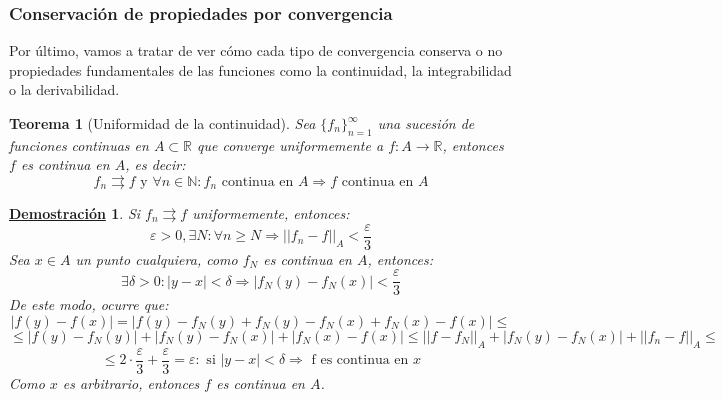 \documentclass[10pt,a4paper,openright]{book}
\theoremstyle{break}
\newtheorem{theo}{Teorema}[chapter]
\newtheorem*{demo}{\underline{Demostración}}
\begin{document}
\subsubsection{Conservación de propiedades por convergencia}
Por último, vamos a tratar de ver cómo cada tipo de convergencia conserva o no propiedades fundamentales de las funciones como la continuidad, la integrabilidad o la derivabilidad.

\begin{theo}[Uniformidad de la continuidad]
Sea $\{f_n\}_{n=1}^\infty$ una sucesión de funciones continuas en $A \subset \mathbb{R}$ que converge uniformemente a $f: A \to \mathbb{R}$, entonces $f$ es continua en $A$, es decir:
$$f_n\rightrightarrows f \mbox{ y } \forall n \in \mathbb{N} : f_n \mbox{ continua  en } A \Rightarrow f \mbox{ continua en }A$$
\end{theo}
\begin{demo}
Si $f_n \rightrightarrows f$ uniformemente, entonces:
$$\varepsilon > 0, \exists N: \forall n \geq N \Rightarrow ||f_n - f ||_A < \frac{\varepsilon}{3}$$
Sea $x \in A$ un punto cualquiera, como $f_N$ es continua en  $A$, entonces:
$$\exists \delta > 0 : |y-x|<\delta \Rightarrow |f_N (y) - f_N (x)| < \frac{\varepsilon}{3}$$
De este modo, ocurre que:
$$|f (y) - f (x)| = |f (y) - f_N (y) + f_N (y) -f_N (x) + f_N (x) - f(x)| \leq $$
$$\leq |f(y) - f_N (y)| + |f_N (y) - f_N (x)| + |f_N (x) - f(x)| \leq || f - f_N ||_A + |f_N (y) - f_N (x)| + ||f_n - f||_A \leq$$
$$\leq 2 \cdot \frac{\varepsilon}{3} + \frac{\varepsilon}{3}  = \varepsilon : \mbox{ si } |y-x| < \delta \Rightarrow \mbox{ f es continua en } x$$
Como $x$ es arbitrario, entonces $f$ es continua en $A$.
\end{demo}
\end{document}
